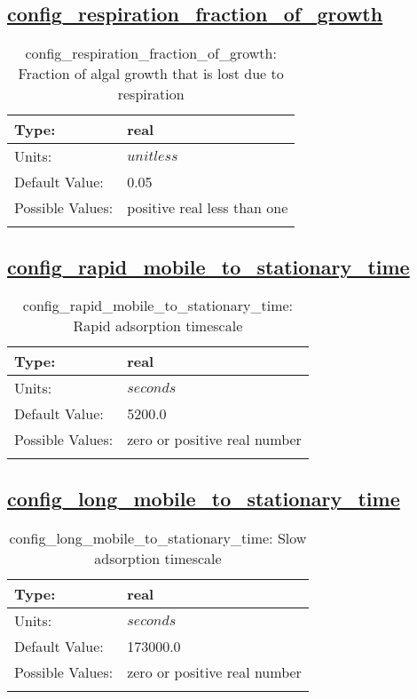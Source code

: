 \subsection[config\_respiration\_fraction\_of\_growth]{\hyperref[sec:nm_tab_biogeochemistry]{config\_respiration\_fraction\_of\_growth}}
\label{subsec:nm_sec_config_respiration_fraction_of_growth}
\begin{center}
\begin{longtable}{| p{2.0in} || p{4.0in} |}
    \hline
    Type: & real \\
    \hline
    Units: & $unitless$ \\
    \hline
    Default Value: & 0.05 \\
    \hline
    Possible Values: & positive real less than one \\
    \hline
    \caption{config\_respiration\_fraction\_of\_growth: Fraction of algal growth that is lost due to respiration}
\end{longtable}
\end{center}
\subsection[config\_rapid\_mobile\_to\_stationary\_time]{\hyperref[sec:nm_tab_biogeochemistry]{config\_rapid\_mobile\_to\_stationary\_time}}
\label{subsec:nm_sec_config_rapid_mobile_to_stationary_time}
\begin{center}
\begin{longtable}{| p{2.0in} || p{4.0in} |}
    \hline
    Type: & real \\
    \hline
    Units: & $seconds$ \\
    \hline
    Default Value: & 5200.0 \\
    \hline
    Possible Values: & zero or positive real number \\
    \hline
    \caption{config\_rapid\_mobile\_to\_stationary\_time: Rapid adsorption timescale  }
\end{longtable}
\end{center}
\subsection[config\_long\_mobile\_to\_stationary\_time]{\hyperref[sec:nm_tab_biogeochemistry]{config\_long\_mobile\_to\_stationary\_time}}
\label{subsec:nm_sec_config_long_mobile_to_stationary_time}
\begin{center}
\begin{longtable}{| p{2.0in} || p{4.0in} |}
    \hline
    Type: & real \\
    \hline
    Units: & $seconds$ \\
    \hline
    Default Value: & 173000.0 \\
    \hline
    Possible Values: & zero or positive real number \\
    \hline
    \caption{config\_long\_mobile\_to\_stationary\_time: Slow adsorption timescale}
\end{longtable}
\end{center}
